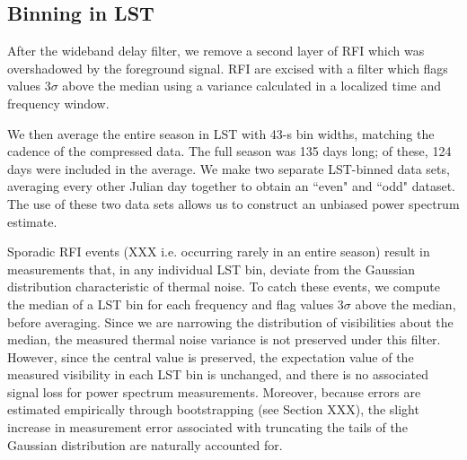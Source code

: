 \documentclass[twocolumn,numberedappendix]{emulateapj} \shorttitle{New Limits on the 21 cm Power Spectrum at $z=8.4$}
\begin{document}
\subsection{Binning in LST}\label{sec:lstbin}

After the wideband delay filter, we remove a second layer of RFI 
 which was overshadowed by the foreground signal. RFI are excised with a filter
which flags values $3\sigma$ above the median using a variance calculated in a
localized time and frequency window.  

We then average the entire season in LST with 43-s bin widths, matching the
cadence of the compressed data. The full season was 135 days long; of these,
124 days were included in the average. We make two separate LST-binned data
sets, averaging every other Julian day together to obtain an ``even" and ``odd"
dataset. The use of these two data sets allows us to construct an unbiased
power spectrum estimate.


Sporadic RFI events (XXX i.e. occurring rarely in an entire season) result
in measurements that, in any individual LST bin, deviate from the Gaussian
distribution characteristic of thermal noise.
To catch these events, we compute the median
of a LST bin for each frequency and flag values 3$\sigma$ above the median,
before averaging. 
Since we are narrowing the
distribution of visibilities about the median, the measured thermal noise
variance is not preserved under this filter.  However, since the central
value is preserved, the expectation value of the measured visibility in each
LST bin is unchanged, and there is no associated signal loss for power spectrum
measurements.  Moreover, because errors are estimated empirically
through bootstrapping (see Section XXX), the slight increase in measurement 
error associated with truncating the tails of the
Gaussian distribution are naturally accounted for.
\end{document}
